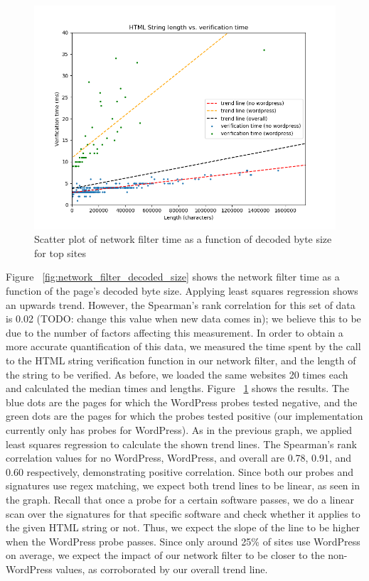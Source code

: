 \begin{figure}[h]
	\includegraphics[scale=0.4]{results/string_length_vs_verification_time}
	\caption{Scatter plot of network filter time as a function of decoded byte size for top sites}
	\label{fig:verification_time_string_length}
\end{figure}

Figure ~\ref{fig:network_filter_decoded_size} shows the network filter time as a function of the page's decoded byte size. Applying least squares regression shows an upwards trend. However, the Spearman's rank correlation for this set of data is 0.02 (TODO: change this value when new data comes in); we believe this to be due to the number of factors affecting this measurement. In order to obtain a more accurate quantification of this data, we measured the time spent by the call to the HTML string verification function in our network filter, and the length of the string to be verified. As before, we loaded the same websites 20 times each and calculated the median times and lengths. Figure ~\ref{fig:verification_time_string_length} shows the results. The blue dots are the pages for which the WordPress probes tested negative, and the green dots are the pages for which the probes tested positive (our implementation currently only has probes for WordPress). As in the previous graph, we applied least squares regression to calculate the shown trend lines. The Spearman's rank correlation values for no WordPress, WordPress, and overall are 0.78, 0.91, and 0.60 respectively, demonstrating positive correlation. Since both our probes and signatures use regex matching, we expect both trend lines to be linear, as seen in the graph. Recall that once a probe for a certain software passes, we do a linear scan over the signatures for that specific software and check whether it applies to the given HTML string or not. Thus, we expect the slope of the line to be higher when the WordPress probe passes. Since only around 25\% of sites use WordPress on average, we expect the impact of our network filter to be closer to the non-WordPress values, as corroborated by our overall trend line.

